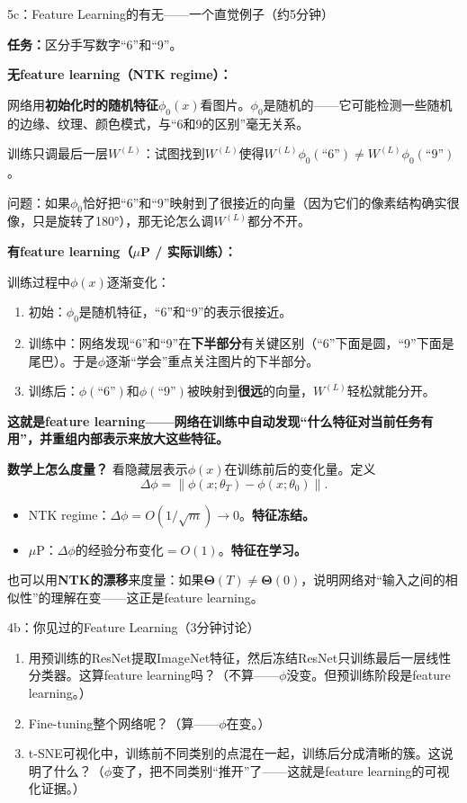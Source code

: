 \documentclass[11pt,a4paper]{article}
\newcommand{\bTheta}{\boldsymbol{\Theta}}
\begin{document}
\begin{handcalc}{5c：Feature Learning的有无——一个直觉例子（约5分钟）}

\textbf{任务：}区分手写数字``6''和``9''。

\textbf{无feature learning（NTK regime）：}

网络用\textbf{初始化时的随机特征}$\phi_0(x)$看图片。$\phi_0$是随机的——它可能检测一些随机的边缘、纹理、颜色模式，与``6和9的区别''毫无关系。

训练只调最后一层$W^{(L)}$：试图找到$W^{(L)}$使得$W^{(L)}\phi_0(\text{``6''}) \neq W^{(L)}\phi_0(\text{``9''})$。

问题：如果$\phi_0$恰好把``6''和``9''映射到了很接近的向量（因为它们的像素结构确实很像，只是旋转了180°），那无论怎么调$W^{(L)}$都分不开。

\tcblower

\textbf{有feature learning（$\mu$P / 实际训练）：}

训练过程中$\phi(x)$逐渐变化：
\begin{enumerate}[leftmargin=*]
\item 初始：$\phi_0$是随机特征，``6''和``9''的表示很接近。
\item 训练中：网络发现``6''和``9''在\textbf{下半部分}有关键区别（``6''下面是圆，``9''下面是尾巴）。于是$\phi$逐渐``学会''重点关注图片的下半部分。
\item 训练后：$\phi(\text{``6''})$和$\phi(\text{``9''})$被映射到\textbf{很远}的向量，$W^{(L)}$轻松就能分开。
\end{enumerate}

\textbf{这就是feature learning——网络在训练中自动发现``什么特征对当前任务有用''，并重组内部表示来放大这些特征。}

\medskip
\textbf{数学上怎么度量？} 看隐藏层表示$\phi(x)$在训练前后的变化量。定义
\[
\Delta\phi = \|\phi(x;\theta_T) - \phi(x;\theta_0)\|.
\]
\begin{itemize}[leftmargin=*]
\item NTK regime：$\Delta\phi = O(1/\sqrt{m}) \to 0$。\textbf{特征冻结。}
\item $\mu$P：$\Delta\phi$的经验分布变化$=O(1)$。\textbf{特征在学习。}
\end{itemize}

也可以用\textbf{NTK的漂移}来度量：如果$\bTheta(T)\neq\bTheta(0)$，说明网络对``输入之间的相似性''的理解在变——这正是feature learning。
\end{handcalc}

\begin{classexercise}{4b：你见过的Feature Learning（3分钟讨论）}
\begin{enumerate}[label=(\alph*)]
\item 用预训练的ResNet提取ImageNet特征，然后冻结ResNet只训练最后一层线性分类器。这算feature learning吗？（不算——$\phi$没变。但预训练阶段是feature learning。）
\item Fine-tuning整个网络呢？（算——$\phi$在变。）
\item t-SNE可视化中，训练前不同类别的点混在一起，训练后分成清晰的簇。这说明了什么？（$\phi$变了，把不同类别``推开''了——这就是feature learning的可视化证据。）
\end{enumerate}
\end{classexercise}
\end{document}
